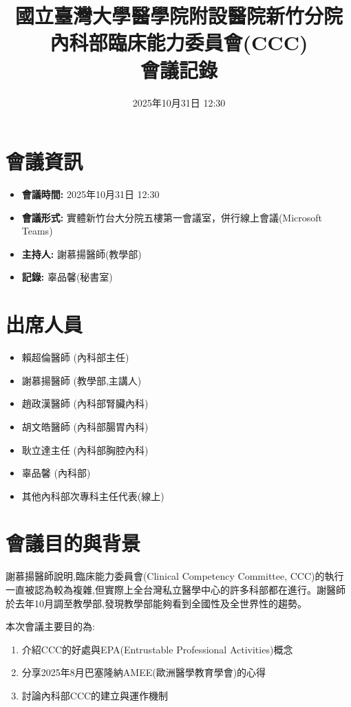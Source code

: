 \documentclass[12pt,a4paper]{article}
\title{國立臺灣大學醫學院附設醫院新竹分院\\內科部臨床能力委員會(CCC)\\會議記錄}
\author{}
\date{2025年10月31日 12:30}
\begin{document}
\maketitle

\section*{會議資訊}
\begin{itemize}[leftmargin=*]
    \item \textbf{會議時間:} 2025年10月31日 12:30
    \item \textbf{會議形式:} 實體新竹台大分院五樓第一會議室，併行線上會議(Microsoft Teams)
    \item \textbf{主持人:} 謝慕揚醫師(教學部)
    \item \textbf{記錄:} 辜品馨(秘書室)
\end{itemize}

\section*{出席人員}
\begin{itemize}[leftmargin=*]
    \item 賴超倫醫師 (內科部主任)
    \item 謝慕揚醫師 (教學部,主講人)
    \item 趙政漢醫師 (內科部腎臟內科)
    \item 胡文皓醫師 (內科部腸胃內科)
    \item 耿立達主任 (內科部胸腔內科)
    \item 辜品馨 (內科部)
    \item 其他內科部次專科主任代表(線上)
\end{itemize}

\section{會議目的與背景}

謝慕揚醫師說明,臨床能力委員會(Clinical Competency Committee, CCC)的執行一直被認為較為複雜,但實際上全台灣私立醫學中心的許多科部都在進行。謝醫師於去年10月調至教學部,發現教學部能夠看到全國性及全世界性的趨勢。

本次會議主要目的為:
\begin{enumerate}[leftmargin=*]
    \item 介紹CCC的好處與EPA(Entrustable Professional Activities)概念
    \item 分享2025年8月巴塞隆納AMEE(歐洲醫學教育學會)的心得
    \item 討論內科部CCC的建立與運作機制
\end{enumerate}
\end{document}
